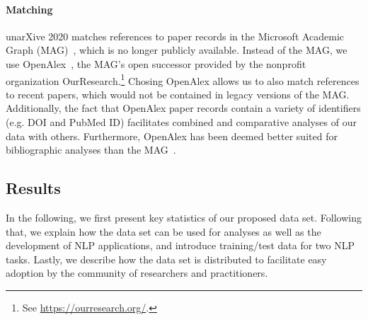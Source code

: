 \paragraph{Matching} unarXive 2020 matches references to paper records in the Microsoft Academic Graph (MAG)~\cite{Sinha2015MAG}, which is no longer publicly available. Instead of the MAG, we use OpenAlex~\cite{openalex}, the MAG's open successor provided by the nonprofit organization OurResearch.\footnote{See \url{https://ourresearch.org/}.} Chosing OpenAlex allows us to also match references to recent papers, which would not be contained in legacy versions of the MAG. Additionally, the fact that OpenAlex paper records contain a variety of identifiers (e.g. DOI and PubMed ID) facilitates combined and comparative analyses of our data with others. Furthermore, OpenAlex has been deemed better suited for bibliographic analyses than the MAG~\cite{openalex-vs-mag}.




\subsection{Results}

In the following, we first present key statistics of our proposed data set. Following that, we explain how the data set can be used for analyses as well as the development of NLP applications, and introduce training/test data for two NLP tasks. Lastly, we describe how the data set is distributed to facilitate easy adoption by the community of researchers and practitioners.


